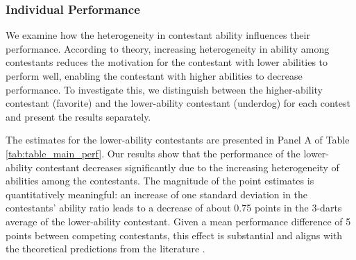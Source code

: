 \documentclass[11pt,a4paper]{article}
\begin{document}
\subsubsection{Individual Performance}\label{subsubsec:within_contest}

We examine how the heterogeneity in contestant ability influences their performance. According to theory, increasing heterogeneity in ability among contestants reduces the motivation for the contestant with lower abilities to perform well, enabling the contestant with higher abilities to decrease performance. To investigate this, we distinguish between the higher-ability contestant (favorite) and the lower-ability contestant (underdog) for each contest and present the results separately.\par

The estimates for the lower-ability contestants are presented in Panel A of Table \ref{tab:table_main_perf}. Our results show that the performance of the lower-ability contestant decreases significantly due to the increasing heterogeneity of abilities among the contestants. The magnitude of the point estimates is quantitatively meaningful: an increase of one standard deviation in the contestants' ability ratio leads to a decrease of about 0.75 points in the 3-darts average of the lower-ability contestant.
Given a mean performance difference of 5 points between competing contestants, this effect is substantial and aligns with the theoretical predictions from the literature \cite{Lazear.1981, Rosen.1986}.\par
\end{document}
